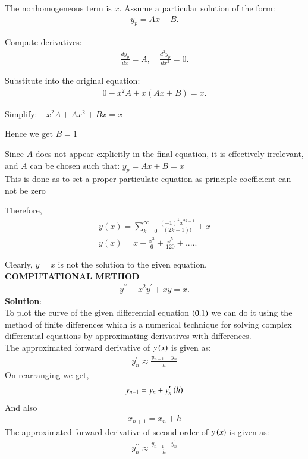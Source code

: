 \documentclass[journal]{IEEEtran}
\begin{document}
The nonhomogeneous term is $x$. Assume a particular solution of the form:
\begin{align}
y_p = Ax + B.
\end{align}

Compute derivatives:
\begin{align}
\frac{dy_p}{dx} = A, \quad \frac{d^2y_p}{dx^2} = 0.
\end{align}

Substitute into the original equation:
\begin{align}
0 - x^2A + x(Ax + B) = x.
\end{align}

Simplify: $-x^2A + Ax^2 + Bx = x$

Hence we get $B=1$

Since $A$ does not appear explicitly in the final equation, it is effectively irrelevant, and $A$ can be chosen such that: $y_p = Ax + B = x$\\
This is done as to set a proper particulate equation as principle coefficient can not be zero


Therefore,
\begin{align}
y(x) = \sum_{k=0}^\infty \frac{(-1)^k x^{2k+1}}{(2k+1)!} + x\\
y(x) = x - \frac{x^3}{6} + \frac{x^5}{120} + .....
\end{align}

Clearly, $y=x$ is not the solution to the given equation.\\



\textbf{COMPUTATIONAL METHOD}\\

\begin{align}
    y^{\prime\prime} -x^2y^\prime + xy = x. 
\end{align}
\textbf{Solution}:\\
To plot the curve of the given differential equation $\left(0.1\right)$ we can do it using the method of finite differences which is a numerical technique for solving complex differential equations by approximating derivatives with differences.\\
The approximated forward derivative of $y\left(x\right)$ is given as:\\
\begin{align}
    y^\prime_n\approx\frac{y_{n+1}-y_n}{h}
\end{align}
On rearranging we get,
\begin{align}
    y_{n+1}=y_n+y^\prime_n\left(h\right)
\end{align}
And also 
\begin{align}
    x_{n+1}=x_n+h
\end{align}
The approximated forward derivative of second order of $y\left(x\right)$ is given as:\\
\begin{align}
    y^{\prime\prime}_n\approx \frac{y^\prime_{n+1}-y^\prime_n}{h}
\end{align}
\end{document}
